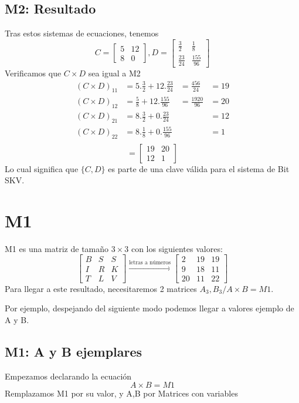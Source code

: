 \documentclass[11pt]{article}
\begin{document}
\subsection{M2: Resultado}
Tras estos sistemas de ecuaciones, tenemos
\[
C = \begin{bmatrix}
5 & 12\\
8 & 0
\end{bmatrix}, D = \begin{bmatrix}
\frac{3}{2} & \frac{1}{8} \\
\frac{23}{24} & \frac{155}{96}
\end{bmatrix}
\]
Verificamos que $ C \times D $ sea igual a M2
\begin{align*}
(C \times D)_{11}&=5.\frac{3}{2} + 12.\frac{23}{24}&=\frac{456}{24}&=19\\
(C \times D)_{12}&=\frac{5}{8} + 12.\frac{155}{96}&=\frac{1920}{96}&=20\\
(C \times D)_{21}&=8.\frac{3}{2} + 0.\frac{23}{24}&&=12\\
(C \times D)_{22}&=8.\frac{1}{8} + 0.\frac{155}{96}&&=1\\
\end{align*}
\[
=
\begin{bmatrix}
19 & 20\\
12 & 1
\end{bmatrix}
\]
Lo cual significa que $\{C, D\}$ es parte de una clave válida para el sistema de Bit SKV.
\pagebreak
\section{M1}
M1 es una matriz de tamaño $3\times3$ con los siguientes
valores:
\[
\begin{bmatrix}
B & S & S \\
I & R & K \\
T & L & V
\end{bmatrix}
\xrightarrow{\text{letras a números}}
\begin{bmatrix}
2 & 19 & 19 \\
9 & 18 & 11 \\
20 & 11 & 22
\end{bmatrix}
\]
Para llegar a este resultado, necesitaremos 2 matrices
$A_{3}, B_{3} / A \times B = M1$.

Por ejemplo, despejando del siguiente modo podemos llegar a valores ejemplo de A y B.

\subsection{M1: A y B ejemplares}
Empezamos declarando la ecuación
\[
A \times B = M1
\]
Remplazamos M1 por su valor, y A,B por Matrices con variables
\end{document}
